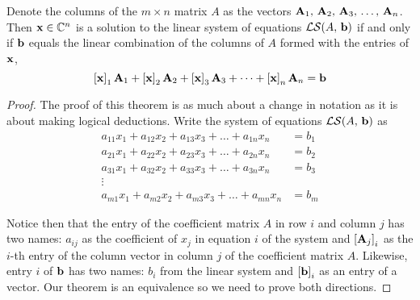 \documentclass{ximera}
\begin{document}
\begin{theorem}
  \label{theorem:SLSLC}
  Denote the columns of the $m\times n$ matrix $A$ as the vectors
  $\mathbf{A}_{1},\,\mathbf{A}_{2},\,\mathbf{A}_{3},\,\ldots,\,\mathbf{A}_{n}$.  Then $\mathbf{x}\in\mathbb{C}^{n}$ is a solution to
  the linear system of equations $\mathcal{LS}\!\left(A,\,\mathbf{b}\right)$ if and
  only if $\mathbf{b}$ equals the linear combination of the columns of
  $A$ formed with the entries of $\mathbf{x}$,
  \[
    \left\lbrack\mathbf{x}\right\rbrack_{1}\mathbf{A}_1+
    \left\lbrack\mathbf{x}\right\rbrack_{2}\mathbf{A}_2+
    \left\lbrack\mathbf{x}\right\rbrack_{3}\mathbf{A}_3+
    \cdots+
    \left\lbrack\mathbf{x}\right\rbrack_{n}\mathbf{A}_n
    =
    \mathbf{b}
  \]

  \begin{proof}
    The proof of this theorem is as much about a change in notation as
    it is about making logical deductions.  Write the system of
    equations $\mathcal{LS}\!\left(A,\,\mathbf{b}\right)$ as
    \begin{align*}
      a_{11}x_1+a_{12}x_2+a_{13}x_3+\dots+a_{1n}x_n&=b_1\\
      a_{21}x_1+a_{22}x_2+a_{23}x_3+\dots+a_{2n}x_n&=b_2\\
      a_{31}x_1+a_{32}x_2+a_{33}x_3+\dots+a_{3n}x_n&=b_3\\
      \vdots&\\
      a_{m1}x_1+a_{m2}x_2+a_{m3}x_3+\dots+a_{mn}x_n&=b_m
    \end{align*}
    
    Notice then that the entry of the coefficient matrix $A$ in row $i$
    and column $j$ has two names: $a_{ij}$ as the coefficient of $x_j$
    in equation $i$ of the system and $\left\lbrack\mathbf{A}_j\right\rbrack_{i}$ as
    the $i$-th entry of the column vector in column $j$ of the
    coefficient matrix $A$.  Likewise, entry $i$ of $\mathbf{b}$ has two
    names: $b_i$ from the linear system and $\left\lbrack\mathbf{b}\right\rbrack_{i}$
    as an entry of a vector.  Our theorem is an equivalence so we need
    to prove both directions.
    

\end{proof}
\end{theorem}
\end{document}
